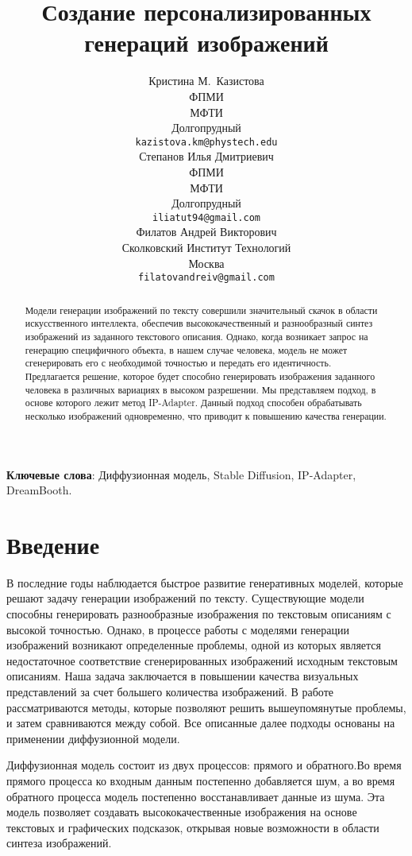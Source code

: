 \documentclass{article}
\title{Создание персонализированных генераций изображений}
\author{ Кристина М.~Казистова \\
	ФПМИ\\
	МФТИ\\
	Долгопрудный \\
	\texttt{kazistova.km@phystech.edu} \\
	\And
	Степанов Илья Дмитриевич \\
	ФПМИ\\
	МФТИ\\
	Долгопрудный \\
	\texttt{iliatut94@gmail.com} \\
    \And
	Филатов Андрей Викторович \\
	Сколковский Институт Технологий\\
	Москва \\
	\texttt{filatovandreiv@gmail.com} \\
}
\date{}
\begin{document}
\maketitle
    
\begin{abstract}
        Модели генерации изображений по тексту совершили значительный скачок в области искусственного интеллекта, обеспечив высококачественный и разнообразный синтез изображений из заданного текстового описания. Однако, когда возникает запрос на генерацию специфичного объекта, в нашем случае человека, модель не может сгенерировать его с необходимой точностью и передать его идентичность. Предлагается решение, которое будет способно генерировать изображения заданного человека в различных вариациях в высоком разрешении. Мы представляем подход, в основе которого лежит метод IP-Adapter. Данный подход способен обрабатывать несколько изображений одновременно, что приводит к повышению качества генерации.
\end{abstract}

\textbf{Ключевые слова}: Диффузионная модель, Stable Diffusion\cite{DBLP:journals/corr/abs-2112-10752}, IP-Adapter\cite{ye2023ip-adapter}, DreamBooth\cite{ruiz2022dreambooth}.

\section{Введение}В последние годы наблюдается быстрое развитие генеративных моделей, которые решают задачу генерации изображений по тексту. Существующие модели способны генерировать разнообразные изображения по текстовым описаниям с высокой точностью. Однако, в процессе работы с моделями генерации изображений возникают определенные проблемы, одной из которых является недостаточное соответствие сгенерированных изображений исходным текстовым описаниям. Наша задача заключается в повышении качества визуальных представлений за счет большего количества изображений. В работе рассматриваются методы, которые позволяют решить вышеупомянутые проблемы, и затем сравниваются между собой. Все описанные далее подходы основаны на применении диффузионной модели\cite{DBLP:journals/corr/abs-2112-10752}. 

Диффузионная модель состоит из двух процессов: прямого и обратного.Во время прямого процесса ко входным данным постепенно добавляется шум, а во время обратного процесса модель постепенно восстанавливает данные из шума. Эта модель позволяет создавать высококачественные изображения на основе текстовых и графических подсказок, открывая новые возможности в области синтеза изображений.
\end{document}
